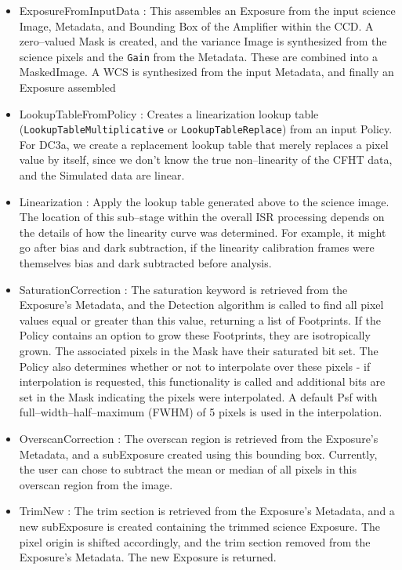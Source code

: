 \begin{itemize}

\item ExposureFromInputData : This assembles an Exposure from the
input science Image, Metadata, and Bounding Box of the Amplifier
within the CCD.  A zero--valued Mask is created, and the variance
Image is synthesized from the science pixels and the {\tt Gain} from
the Metadata.  These are combined into a MaskedImage.  A WCS is
synthesized from the input Metadata, and finally an Exposure assembled

\item LookupTableFromPolicy : Creates a linearization lookup table
({\tt LookupTableMultiplicative} or {\tt LookupTableReplace}) from an
input Policy.  For DC3a, we create a replacement lookup table that
merely replaces a pixel value by itself, since we don't know the true
non--linearity of the CFHT data, and the Simulated data are linear.

\item Linearization : Apply the lookup table generated above to the
science image.  The location of this sub--stage within the overall ISR
processing depends on the details of how the linearity curve was
determined.  For example, it might go after bias and dark subtraction,
if the linearity calibration frames were themselves bias and dark
subtracted before analysis.

\item SaturationCorrection : The saturation keyword is retrieved from
the Exposure's Metadata, and the Detection algorithm is called to find
all pixel values equal or greater than this value, returning a list of
Footprints.  If the Policy contains an option to grow these
Footprints, they are isotropically grown.  The associated pixels in
the Mask have their saturated bit set.  The Policy also determines
whether or not to interpolate over these pixels - if interpolation is
requested, this functionality is called and additional bits are set in
the Mask indicating the pixels were interpolated.  A default Psf with
full--width--half--maximum (FWHM) of 5 pixels is used in the
interpolation.

\item OverscanCorrection : The overscan region is retrieved from the
Exposure's Metadata, and a subExposure created using this bounding
box.  Currently, the user can chose to subtract the mean or median of
all pixels in this overscan region from the image.  

\item TrimNew : The trim section is retrieved from the Exposure's
Metadata, and a new subExposure is created containing the trimmed
science Exposure.  The pixel origin is shifted accordingly, and the
trim section removed from the Exposure's Metadata.  The new Exposure
is returned.


\end{itemize}
